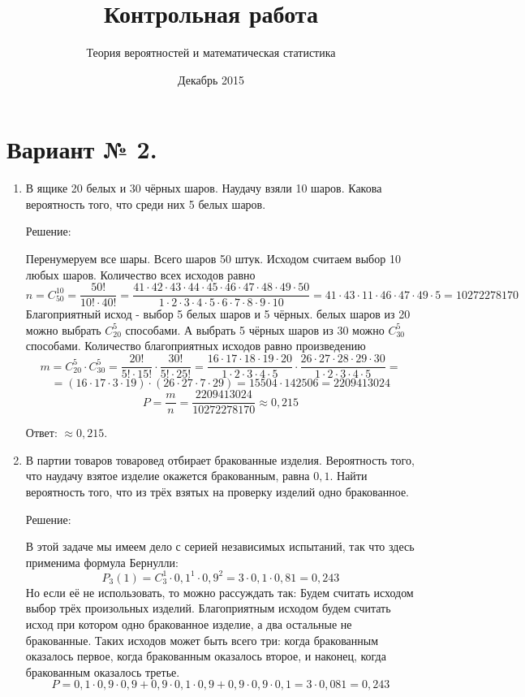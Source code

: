 \documentclass{article}
\title{Контрольная работа}
\author{Теория вероятностей и математическая статистика}
\date{Декабрь 2015}
\begin{document}
\maketitle
\section*{Вариант № 2.}
\begin{enumerate}

\item %
В ящике 20 белых и 30 чёрных шаров. Наудачу взяли 10 шаров. Какова вероятность того, что среди них 5 белых шаров.
\begin{center}Решение:\end{center}
Перенумеруем все шары. Всего шаров 50 штук. Исходом считаем выбор 10 любых шаров.
Количество всех исходов равно
$$n=C_{50}^{10}=\frac{50!}{10!\cdot40!}=\frac{41\cdot42\cdot43\cdot44\cdot45\cdot46\cdot47\cdot48\cdot49\cdot50}{1\cdot2\cdot3\cdot4\cdot5\cdot6\cdot7\cdot8\cdot9\cdot10}=41\cdot43\cdot11\cdot46\cdot47\cdot49\cdot5=10272278170$$
Благоприятный исход - выбор 5 белых шаров и 5 чёрных.  белых шаров из 20 можно выбрать $C_{20}^{5}$ способами. А выбрать 5 чёрных шаров из 30 можно $C_{30}^{5}$ способами. \newline
Количество благоприятных исходов равно произведению
$$m=C_{20}^{5}\cdot C_{30}^{5}=\frac{20!}{5!\cdot15!}\cdot\frac{30!}{5!\cdot25!}=\frac{16\cdot17\cdot18\cdot19\cdot20}{1\cdot2\cdot3\cdot4\cdot5}\cdot\frac{26\cdot27\cdot28\cdot29\cdot30}{1\cdot2\cdot3\cdot4\cdot5}=$$
$$=(16\cdot17\cdot3\cdot19)\cdot(26\cdot27\cdot7\cdot29)=15504\cdot142506=2209413024$$
$$P=\frac{m}{n}=\frac{2209413024}{10272278170}\approx0,215$$

Ответ: $\approx0,215$.

\item %
В партии товаров товаровед отбирает бракованные изделия. Вероятность того, что наудачу взятое изделие окажется бракованным, равна $0,1$. Найти вероятность того, что из трёх взятых на проверку изделий одно бракованное.
\begin{center}Решение:\end{center}
В этой задаче мы имеем дело с серией независимых испытаний, так что здесь применима формула Бернулли:
$$P_3(1)=C_3^1\cdot0,1^1\cdot0,9^2=3\cdot0,1\cdot0,81=0,243$$
Но если её не использовать, то можно рассуждать так: \newline
Будем считать исходом выбор трёх произольных изделий. Благоприятным исходом будем считать исход при котором одно бракованное изделие, а два остальные не бракованные. Таких исходов может быть всего три: когда бракованным оказалось первое, когда бракованным оказалось второе, и наконец, когда бракованным оказалось третье.
$$P=0,1\cdot0,9\cdot0,9+0,9\cdot0,1\cdot0,9+0,9\cdot0,9\cdot0,1=3\cdot0,081=0,243$$


\end{enumerate}
\end{document}
